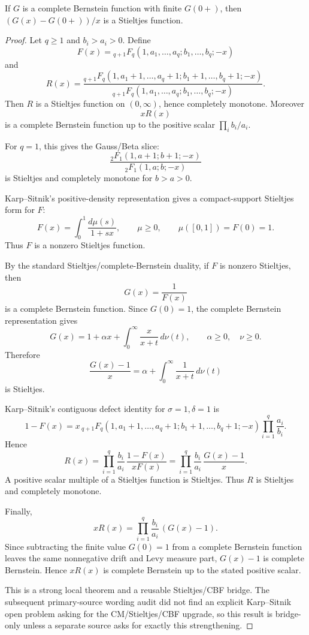 \begin{proposition}
\label{res:cbf-difference-quotient-stieltjes}
If \(G\) is a complete Bernstein function with finite \(G(0+)\), then \((G(x)-G(0+))/x\) is a Stieltjes function.
\end{proposition}
\begin{proof}
Let \(q\ge1\) and \(b_i>a_i>0\). Define
\[
F(x)={}_{q+1}F_q(1,a_1,\ldots,a_q;b_1,\ldots,b_q;-x)
\]
and
\[
R(x)=
\frac{{}_{q+1}F_q(1,a_1+1,\ldots,a_q+1;b_1+1,\ldots,b_q+1;-x)}
{{}_{q+1}F_q(1,a_1,\ldots,a_q;b_1,\ldots,b_q;-x)}.
\]
Then \(R\) is a Stieltjes function on \((0,\infty)\), hence completely monotone. Moreover
\[
xR(x)
\]
is a complete Bernstein function up to the positive scalar \(\prod_i b_i/a_i\).

For \(q=1\), this gives the Gauss/Beta slice:
\[
\frac{{}_2F_1(1,a+1;b+1;-x)}{{}_2F_1(1,a;b;-x)}
\]
is Stieltjes and completely monotone for \(b>a>0\).

Karp--Sitnik's positive-density representation gives a compact-support Stieltjes form for \(F\):
\[
F(x)=\int_0^1 \frac{d\mu(s)}{1+sx},
\qquad \mu\ge0,
\qquad \mu([0,1])=F(0)=1.
\]
Thus \(F\) is a nonzero Stieltjes function.

By the standard Stieltjes/complete-Bernstein duality, if \(F\) is nonzero Stieltjes, then
\[
G(x)=\frac1{F(x)}
\]
is a complete Bernstein function. Since \(G(0)=1\), the complete Bernstein representation gives
\[
G(x)=1+\alpha x+\int_0^\infty \frac{x}{x+t}\,d\nu(t),
\qquad \alpha\ge0,\quad \nu\ge0.
\]
Therefore
\[
\frac{G(x)-1}{x}
=\alpha+\int_0^\infty \frac{1}{x+t}\,d\nu(t)
\]
is Stieltjes.

Karp--Sitnik's contiguous defect identity for \(\sigma=1,\delta=1\) is
\[
1-F(x)
=x\,{}_{q+1}F_q(1,a_1+1,\ldots,a_q+1;b_1+1,\ldots,b_q+1;-x)
\prod_{i=1}^q\frac{a_i}{b_i}.
\]
Hence
\[
R(x)=
\prod_{i=1}^q\frac{b_i}{a_i}\,
\frac{1-F(x)}{xF(x)}
=
\prod_{i=1}^q\frac{b_i}{a_i}\,
\frac{G(x)-1}{x}.
\]
A positive scalar multiple of a Stieltjes function is Stieltjes. Thus \(R\) is Stieltjes and completely monotone.

Finally,
\[
xR(x)=\prod_{i=1}^q\frac{b_i}{a_i}\,(G(x)-1).
\]
Since subtracting the finite value \(G(0)=1\) from a complete Bernstein function leaves the same nonnegative drift and Levy measure part, \(G(x)-1\) is complete Bernstein. Hence \(xR(x)\) is complete Bernstein up to the stated positive scalar.

This is a strong local theorem and a reusable Stieltjes/CBF bridge. The subsequent primary-source wording audit did not find an explicit Karp--Sitnik open problem asking for the CM/Stieltjes/CBF upgrade, so this result is bridge-only unless a separate source asks for exactly this strengthening.
\end{proof}


